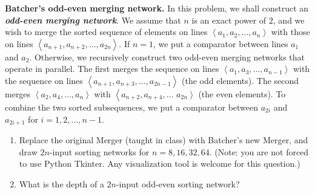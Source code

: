 \documentclass[12pt,a4paper]{article}
\theoremstyle{definition}
\begin{document}
\begin{enumerate}
    \textbf{Batcher's odd-even merging network.} In this problem, we shall construct an \textbf{\textit{odd-even merging network}}. We assume that $n$ is an exact power of $2$, and we wish to merge the sorted sequence of elements on lines $\left\langle a_{1}, a_{2}, \ldots, a_{n}\right\rangle$ with those on lines $\left\langle a_{n+1}, a_{n+2}, \ldots, a_{2n}\right\rangle .$ If $n=1$, we put a comparator between lines $a_{1}$ and $a_{2}$. Otherwise, we recursively construct two odd-even merging networks that operate in parallel. The first merges the sequence on lines $\left\langle a_{1}, a_{3}, \ldots, a_{n-1}\right\rangle$ with the sequence on lines $\left\langle a_{n+1}, a_{n+3}, \ldots, a_{2n-1}\right\rangle$ (the
    odd elements). The second merges $\left\langle a_{2}, a_{4}, \ldots, a_{n}\right\rangle$ with $\left\langle a_{n+2}, a_{n+4}, \ldots\right.$
    $\left.a_{2n}\right\rangle$ (the even elements). To combine the two sorted subsequences, we put a comparator between $a_{2i}$ and $a_{2i+1}$ for $i=1,2, \ldots, n-1$.
    \begin{enumerate}
    	\item Replace the original Merger (taught in class) with Batcher's new Merger, and draw $2n$-input sorting networks for $n=8, 16, 32, 64$. {\color{blue}(Note: you are not forced to use Python Tkinter. Any visualization tool is welcome for this question.)}
    	
    	\item What is the depth of a $2n$-input odd-even sorting network?
    	

\end{enumerate}
\end{enumerate}
\end{document}
